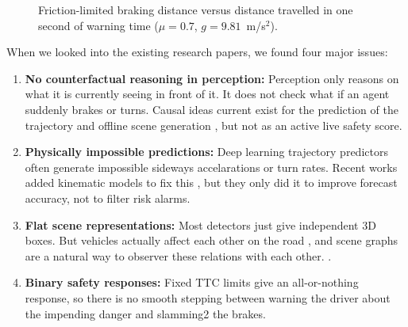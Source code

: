 \documentclass[preprint,12pt]{elsarticle}
\begin{document}
\begin{figure}[H]
\centering
{}
\captionsetup{singlelinecheck = false, format= hang, justification=justified, font=footnotesize, labelsep=space}
\caption{Friction-limited braking distance versus distance travelled in one second of warning time ($\mu=0.7$, $g=9.81$~m/s$^2$).}
\label{fig_intro}
\end{figure}

When we looked into the existing research papers, we found four major issues:
\begin{enumerate}
    \item \textbf{No counterfactual reasoning in perception:} Perception only reasons on what it is currently seeing in front of it. It does not check what if an agent suddenly brakes or turns. Causal ideas current exist for the prediction of the trajectory \cite{han2025cicr, wang2025beyond} and offline scene generation \cite{jing2026counterscene}, but not as an active live safety score.
    \item \textbf{Physically impossible predictions:} Deep learning trajectory predictors often generate impossible sideways accelarations or turn rates. Recent works added kinematic models to fix this \cite{liao2024physics, baden2025tpk, chugh2025xtrack}, but they only did it to improve forecast accuracy, not to filter risk alarms.
    \item \textbf{Flat scene representations:} Most detectors just give independent 3D boxes. But vehicles actually affect each other on the road \cite{ahmadi2025critic}, and scene graphs are a natural way to observer these relations with each other. \cite{hallyburton2025neuspaper}.
    \item \textbf{Binary safety responses:} Fixed TTC limits give an all-or-nothing response, so there is no smooth stepping between warning the driver about the impending danger and slamming2 the brakes.
\end{enumerate}
\end{document}
